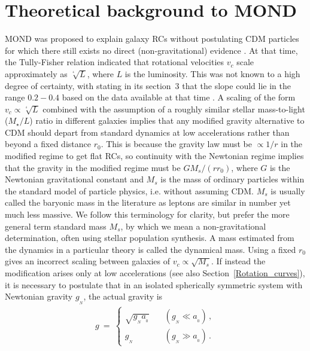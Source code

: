 \documentclass[fleqn,usenatbib,useAMS,onecolumn]{mnras} %
\begin{document}
\section{Theoretical background to MOND}
\label{MOND_theory}

MOND was proposed to explain galaxy RCs without postulating CDM particles for which there still exists no direct (non-gravitational) evidence \citep{Milgrom_1983}. At that time, the Tully-Fisher relation \citep[TFR;][]{Tully_Fisher_1977} indicated that rotational velocities $v_c$ scale approximately as $\sqrt[^4]{L}$, where $L$ is the luminosity. This was not known to a high degree of certainty, with \citet{Milgrom_1983_galaxies} stating in its section~3 that the slope could lie in the range $0.2-0.4$ based on the data available at that time \citep[for a historical review, see e.g.][]{Sanders_2010, Sanders_2015}. A scaling of the form $v_c \propto \sqrt[^4]{L}$ combined with the assumption of a roughly similar stellar mass-to-light ($M_{\star}/L$) ratio in different galaxies implies that any modified gravity alternative to CDM should depart from standard dynamics at low accelerations rather than beyond a fixed distance $r_0$. This is because the gravity law must be $\propto 1/r$ in the modified regime to get flat RCs, so continuity with the Newtonian regime implies that the gravity in the modified regime must be $GM_s/\left(rr_0\right)$, where $G$ is the Newtonian gravitational constant and $M_s$ is the mass of ordinary particles within the standard model of particle physics, i.e. without assuming CDM. $M_s$ is usually called the baryonic mass in the literature as leptons are similar in number yet much less massive. We follow this terminology for clarity, but prefer the more general term standard mass $M_s$, by which we mean a non-gravitational determination, often using stellar population synthesis. A mass estimated from the dynamics in a particular theory is called the dynamical mass. Using a fixed $r_0$ gives an incorrect scaling between galaxies of $v_c \propto \sqrt{M_s}$. If instead the modification arises only at low accelerations (see also Section~\ref{Rotation_curves}), it is necessary to postulate that in an isolated spherically symmetric system with Newtonian gravity $g_{_N}$, the actual gravity is
\begin{eqnarray}
	g ~=~ \left\{
	\begin{array}{ll}
		\sqrt{g_{_N} a_{_0}} &\quad \left( g_{_N} \ll a_{_0} \right) \, , \\ 
		g_{_N} &\quad \left( g_{_N} \gg a_{_0} \right) \, .
	\end{array}
	\right.
	\label{MOND_basic}
\end{eqnarray}
\end{document}
